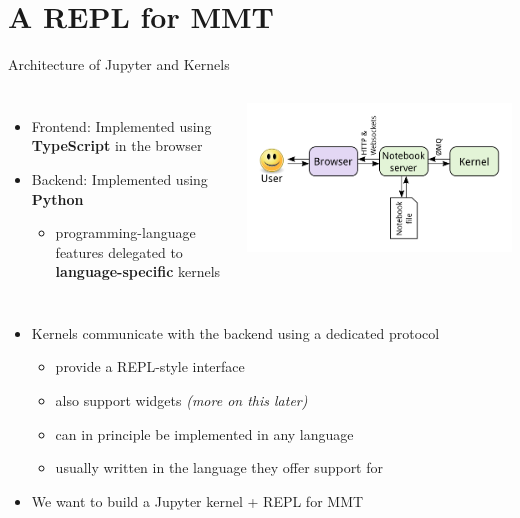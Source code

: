 \documentclass{beamer}
\begin{document}
    \section{A REPL for MMT}

    \begin{frame}{Architecture of Jupyter and Kernels}
        \begin{columns}
            \begin{itemize}
                \item Frontend: Implemented using \textbf{TypeScript} in the browser
                \item Backend: Implemented using \textbf{Python}
                \begin{itemize}
                    \item programming-language features delegated to \textbf{language-specific} kernels
                \end{itemize}
            \end{itemize}
            \includegraphics[scale=0.25]{images/jupyterarch}
        \end{columns}
        \begin{itemize}
            \item Kernels communicate with the backend using a dedicated protocol
            \begin{itemize}
                \item provide a REPL-style interface
                \item also support widgets \textit{(more on this later)}
                \item can in principle be implemented in any language
                \item usually written in the language they offer support for
            \end{itemize}
            \item We want to build a Jupyter kernel + REPL for MMT
        \end{itemize}
    \end{frame}
\end{document}
